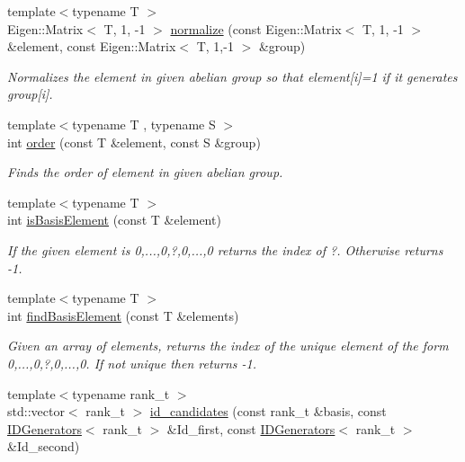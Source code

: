 \begin{DoxyCompactItemize}
\item 
{\footnotesize template$<$typename T $>$ }\\Eigen\+::\+Matrix$<$ T, 1, -\/1 $>$ \hyperlink{namespaceMackey_aa3ee3f5d387e24122f0e2865f742675f}{normalize} (const Eigen\+::\+Matrix$<$ T, 1, -\/1 $>$ \&element, const Eigen\+::\+Matrix$<$ T, 1,-\/1 $>$ \&group)
\begin{DoxyCompactList}\small\item\em Normalizes the element in given abelian group so that element\mbox{[}i\mbox{]}=1 if it generates group\mbox{[}i\mbox{]}. \end{DoxyCompactList}\item 
{\footnotesize template$<$typename T , typename S $>$ }\\int \hyperlink{namespaceMackey_a4abdca157edcf425b1e7ceff39d74c2f}{order} (const T \&element, const S \&group)
\begin{DoxyCompactList}\small\item\em Finds the order of element in given abelian group. \end{DoxyCompactList}\item 
{\footnotesize template$<$typename T $>$ }\\int \hyperlink{namespaceMackey_a69fa6a0eac2520c76251b0799fa9357f}{is\+Basis\+Element} (const T \&element)
\begin{DoxyCompactList}\small\item\em If the given element is 0,...,0,?,0,...,0 returns the index of ?. Otherwise returns -\/1. \end{DoxyCompactList}\item 
{\footnotesize template$<$typename T $>$ }\\int \hyperlink{namespaceMackey_ab5bc349f95c14d448e42622de2d6a448}{find\+Basis\+Element} (const T \&elements)
\begin{DoxyCompactList}\small\item\em Given an array of elements, returns the index of the unique element of the form 0,...,0,?,0,...,0. If not unique then returns -\/1. \end{DoxyCompactList}\item 
{\footnotesize template$<$typename rank\+\_\+t $>$ }\\std\+::vector$<$ rank\+\_\+t $>$ \hyperlink{namespaceMackey_a83ac78e6d1695af40d0fa58af5255e84}{id\+\_\+candidates} (const rank\+\_\+t \&basis, const \hyperlink{classMackey_1_1IDGenerators}{I\+D\+Generators}$<$ rank\+\_\+t $>$ \&Id\+\_\+first, const \hyperlink{classMackey_1_1IDGenerators}{I\+D\+Generators}$<$ rank\+\_\+t $>$ \&Id\+\_\+second)

\end{DoxyCompactItemize}
